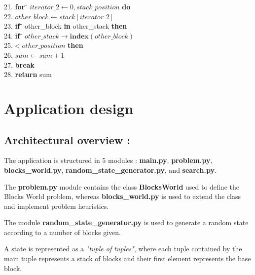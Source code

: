 \documentclass{article}
\begin{document}
\begin{center}
\begin{tabbing}
21. \indent\>\>\>\>\>\>\>\textbf{for \=} $iterator\_2\leftarrow 0,stack\_position$ \textbf{do}\\
22. \indent\>\>\>\>\>\>\>\>$other\_block\leftarrow stack[iterator\_2]$\\
23. \indent\>\>\>\>\>\>\>\>\textbf{if \=} {other\_block} \textbf{in}
{other\_stack} \textbf{then}\\
24. \indent \>\>\>\>\>\>\>\>\>\textbf{if \=} $other\_stack\rightarrow \textbf{index}(other\_block)$\\ 25.\indent \>\>\>\>\>\>\>\>\>$< other\_position$ \textbf{then}\\
26. \indent \>\>\>\>\>\>\>\>\>\>$sum\leftarrow sum + 1$\\
27. \indent \>\>\>\>\>\>\>\>\>\>\textbf{break}\\
28. \indent \textbf{return} sum\\

\end{tabbing}
\end{center}

\section{Application design}

    \subsection{\textbf{Architectural overview :}}
    \vspace{0.5cm}
  
    The application is structured in 5 modules : \textbf{main.py}, \textbf{problem.py},\\
    \textbf{blocks\_world.py}, \textbf{random\_state\_generator.py}, and \textbf{search.py}.
    
    The \textbf{problem.py} module contains the class \textbf{BlocksWorld} used to define the Blocks World problem, whereas \textbf{blocks\_world.py} is used to extend the class and implement problem heuristics.
    
    The module \textbf{random\_state\_generator.py} is used to generate a random state according to a number of blocks given.
    
    A state is represented as a \textit{"tuple of tuples"}, where each tuple contained by the main tuple represents a stack of blocks and their first element represents the base block.
    
\end{document}
